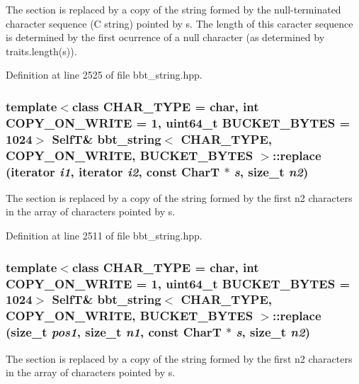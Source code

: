 The section is replaced by a copy of the string formed by the null-terminated character sequence (C string) pointed by s. The length of this caracter sequence is determined by the first ocurrence of a null character (as determined by traits.length(s)). 

Definition at line 2525 of file bbt\_\-string.hpp.\hypertarget{classbbt__string_1e73d6742c06f347e28afdfc9a9c3a6c}{
\subsubsection[{replace}]{\setlength{\rightskip}{0pt plus 5cm}template$<$class CHAR\_\-TYPE  = char, int COPY\_\-ON\_\-WRITE = 1, uint64\_\-t BUCKET\_\-BYTES = 1024$>$ {\bf SelfT}\& {\bf bbt\_\-string}$<$ CHAR\_\-TYPE, COPY\_\-ON\_\-WRITE, BUCKET\_\-BYTES $>$::replace (iterator {\em i1}, \/  iterator {\em i2}, \/  const CharT $\ast$ {\em s}, \/  size\_\-t {\em n2})}}
\label{classbbt__string_1e73d6742c06f347e28afdfc9a9c3a6c}


The section is replaced by a copy of the string formed by the first n2 characters in the array of characters pointed by s. 

Definition at line 2511 of file bbt\_\-string.hpp.\hypertarget{classbbt__string_2855c7c1db09f625b3d0fc7311a61923}{
\subsubsection[{replace}]{\setlength{\rightskip}{0pt plus 5cm}template$<$class CHAR\_\-TYPE  = char, int COPY\_\-ON\_\-WRITE = 1, uint64\_\-t BUCKET\_\-BYTES = 1024$>$ {\bf SelfT}\& {\bf bbt\_\-string}$<$ CHAR\_\-TYPE, COPY\_\-ON\_\-WRITE, BUCKET\_\-BYTES $>$::replace (size\_\-t {\em pos1}, \/  size\_\-t {\em n1}, \/  const CharT $\ast$ {\em s}, \/  size\_\-t {\em n2})}}
\label{classbbt__string_2855c7c1db09f625b3d0fc7311a61923}


The section is replaced by a copy of the string formed by the first n2 characters in the array of characters pointed by s. 

